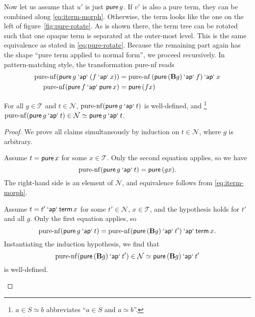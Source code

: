 Now let us assume that $u'$ is just $\operatorname{\mathsf{pure}} g$.
If $v'$ is also a pure term, they can be combined along \eqref{eq:iterm-morph}.
Otherwise, the term looks like the one on the left of figure~\ref{fig:pure-rotate}.
As is shown there, the term tree can be rotated such that one opaque term is
separated at the outer-most level.
This is the same equivalence as stated in \eqref{eq:pure-rotate}.
Because the remaining part again has the shape ``pure term applied to normal
form'', we proceed recursively.
In pattern-matching style, the transformation pure-nf reads
\begin{align}
	\operatorname{pure-nf}(\operatorname{\mathsf{pure}} g \mathbin{\mathsf{`ap`}} (f \mathbin{\mathsf{`ap`}} x)) &=
		\operatorname{pure-nf}{(\operatorname{\mathsf{pure}}{(\mathbf{B} g)} \mathbin{\mathsf{`ap`}} f)} \mathbin{\mathsf{`ap`}} x \\
	\operatorname{pure-nf}(\operatorname{\mathsf{pure}} f \mathbin{\mathsf{`ap`}} \operatorname{\mathsf{pure}} x) &= \operatorname{\mathsf{pure}}{(f x)}
\end{align}
\begin{lemma}\label{thm:pure-nf}
For all $g \in \mathcal{T}$ and $t \in \mathcal{N}$,
$\operatorname{pure-nf}(\operatorname{\mathsf{pure}} g \mathbin{\mathsf{`ap`}} t)$ is well-defined, and%
\/\footnote{$a \in S \simeq b$ abbreviates ``$a \in S$ and $a \simeq b$''.}
$\operatorname{pure-nf}(\operatorname{\mathsf{pure}} g \mathbin{\mathsf{`ap`}} t) \in \mathcal{N} \simeq \operatorname{\mathsf{pure}} g \mathbin{\mathsf{`ap`}} t$.
\end{lemma}
\begin{proof}
We prove all claims simultaneously by induction on $t \in \mathcal{N}$,
where $g$ is arbitrary.
\begin{prfcases}
\item Assume $t = \operatorname{\mathsf{pure}} x$ for some $x \in \mathcal{T}$.
	Only the second equation applies, so we have
	\[ \operatorname{pure-nf}(\operatorname{\mathsf{pure}} g \mathbin{\mathsf{`ap`}} t) = \operatorname{\mathsf{pure}}{(g x)}. \]
	The right-hand side is an element of $\mathcal{N}$, and equivalence follows
	from \eqref{eq:iterm-morph}.
\item Assume $t = t' \mathbin{\mathsf{`ap`}} \operatorname{\mathsf{term}} x$ for some
	$t' \in \mathcal{N}$, $x \in \mathcal{T}$, and the hypothesis holds for $t'$
	and all $g$.
	Only the first equation applies, so
	\[ \operatorname{pure-nf}(\operatorname{\mathsf{pure}} g \mathbin{\mathsf{`ap`}} t) = \operatorname{pure-nf}(\operatorname{\mathsf{pure}}{(\mathbf{B} g)} \mathbin{\mathsf{`ap`}} t') \mathbin{\mathsf{`ap`}} \operatorname{\mathsf{term}} x. \]
	Instantiating the induction hypothesis, we find that
	\[ \operatorname{pure-nf}(\operatorname{\mathsf{pure}}{(\mathbf{B} g)} \mathbin{\mathsf{`ap`}} t') \in \mathcal{N} \simeq \operatorname{\mathsf{pure}}{(\mathbf{B} g)} \mathbin{\mathsf{`ap`}} t' \]
	is well-defined.
	\todo
\end{prfcases}
\end{proof}

